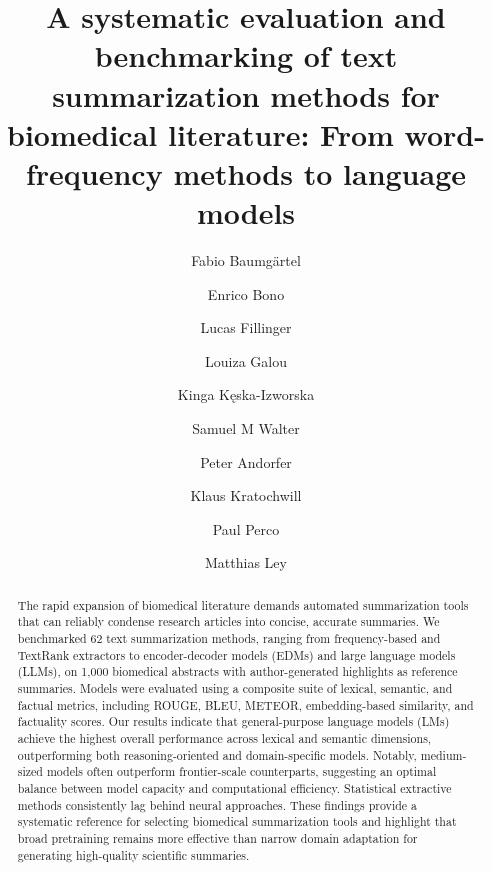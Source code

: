 
\title{A systematic evaluation and benchmarking of text summarization methods for biomedical literature: From word-frequency methods to language models}

\author[1,*]{Fabio Baumgärtel }
\author[1,2,*]{Enrico Bono }
\author[1]{Lucas Fillinger }
\author[1,2]{Louiza Galou }
\author[1]{Kinga Kęska-Izworska }
\author[1]{Samuel M Walter }
\author[1]{Peter Andorfer }
\author[1,2]{Klaus Kratochwill }
\author[1,3]{Paul Perco }
\author[1,2,\Letter]{Matthias Ley }


\date{}

\maketitle

\begin{abstract}
The rapid expansion of biomedical literature demands automated summarization tools that can reliably condense research articles into concise, accurate summaries. We benchmarked 62 text summarization methods, ranging from frequency-based and TextRank extractors to encoder-decoder models (EDMs) and large language models (LLMs), on 1,000 biomedical abstracts with author-generated highlights as reference summaries. Models were evaluated using a composite suite of lexical, semantic, and factual metrics, including ROUGE, BLEU, METEOR, embedding-based similarity, and factuality scores. Our results indicate that general-purpose language models (LMs) achieve the highest overall performance across lexical and semantic dimensions, outperforming both reasoning-oriented and domain-specific models. Notably, medium-sized models often outperform frontier-scale counterparts, suggesting an optimal balance between model capacity and computational efficiency. Statistical extractive methods consistently lag behind neural approaches. These findings provide a systematic reference for selecting biomedical summarization tools and highlight that broad pretraining remains more effective than narrow domain adaptation for generating high-quality scientific summaries.
\end{abstract}

